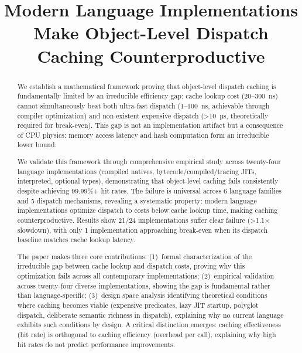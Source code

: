 \documentclass[sigplan,final,acmsmall,review,screen]{acmart}
\begin{document}
\title{Modern Language Implementations Make Object-Level Dispatch Caching Counterproductive}


\begin{abstract}
  We establish a mathematical framework proving that object-level dispatch caching is fundamentally limited by an irreducible efficiency gap:
  cache lookup cost (20--300~ns) cannot simultaneously beat both ultra-fast dispatch (1--100~ns, achievable through compiler optimization) and
  non-existent expensive dispatch (>10~µs, theoretically required for break-even). This gap is not an implementation artifact but a consequence
  of CPU physics: memory access latency and hash computation form an irreducible lower bound.

  We validate this framework through comprehensive empirical study across twenty-four language implementations (compiled natives, bytecode/compiled/tracing JITs,
  interpreted, optional types), demonstrating that object-level caching fails consistently despite achieving 99.99\%+ hit rates. The failure is universal
  across 6 language families and 5 dispatch mechanisms, revealing a systematic property: modern language implementations optimize dispatch to costs below
  cache lookup time, making caching counterproductive. Results show 21/24 implementations suffer clear failure (>1.1× slowdown), with only 1 implementation
  approaching break-even when its dispatch baseline matches cache lookup latency.

  The paper makes three core contributions: (1)~formal characterization of the irreducible gap between cache lookup and dispatch costs, proving why
  this optimization fails across all contemporary implementations; (2)~empirical validation across twenty-four diverse implementations, showing the gap is
  fundamental rather than language-specific; (3)~design space analysis identifying theoretical conditions where caching becomes viable (expensive predicates,
  lazy JIT startup, polyglot dispatch, deliberate semantic richness in dispatch), explaining why no current language exhibits such conditions by design.
  A critical distinction emerges: caching effectiveness (hit rate) is orthogonal to caching efficiency (overhead per call), explaining why high hit rates
  do not predict performance improvements.
\end{abstract}
\end{document}
